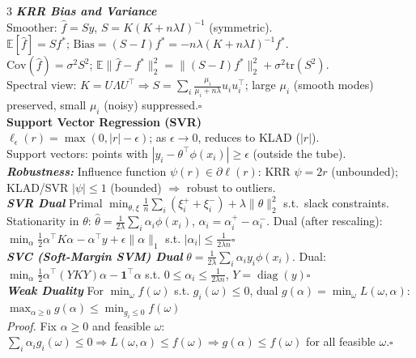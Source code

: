 \documentclass[a4paper,7pt]{article}
\begin{document}
\begin{multicols*}{3}
\textit{\textbf{KRR Bias and Variance}}\\
Smoother: $\hat f=Sy$, $S=K(K+n\lambda I)^{-1}$ (symmetric).\\
$\mathbb{E}[\hat f]=Sf^*$; $\mathrm{Bias}=(S-I)f^*=-n\lambda(K+n\lambda I)^{-1}f^*$.\\
$\mathrm{Cov}(\hat f)=\sigma^2 S^2$; $\mathbb{E}\|\hat f-f^*\|_2^2=\|(S-I)f^*\|_2^2+\sigma^2\mathrm{tr}(S^2)$.\\
Spectral view: $K=U\Lambda U^\top\Rightarrow S=\sum_i\frac{\mu_i}{\mu_i+n\lambda}u_i u_i^\top$; large $\mu_i$ (smooth modes) preserved, small $\mu_i$ (noisy) suppressed.\hfill$\square$\\

\textbf{Support Vector Regression (SVR)}\\
$\ell_\epsilon(r)=\max(0,|r|-\epsilon)$; as $\epsilon\to 0$, reduces to KLAD ($|r|$).\\
Support vectors: points with $|y_i-\theta^\top\phi(x_i)|\geq\epsilon$ (outside the tube).\\
\textit{\textbf{Robustness:}} Influence function $\psi(r)\in\partial\ell(r)$: KRR $\psi=2r$ (unbounded); KLAD/SVR $|\psi|\leq 1$ (bounded) $\Rightarrow$ robust to outliers.\\

\textit{\textbf{SVR Dual}} Primal $\min_{\theta,\xi}\frac{1}{n}\sum_i(\xi_i^++\xi_i^-)+\lambda\|\theta\|_2^2$ s.t.\ slack constraints. Stationarity in $\theta$: $\hat\theta=\frac{1}{2\lambda}\sum_i\alpha_i\phi(x_i)$, $\alpha_i=\alpha_i^+-\alpha_i^-$. Dual (after rescaling):\\
$\min_\alpha\frac{1}{2}\alpha^\top K\alpha-\alpha^\top y+\epsilon\|\alpha\|_1$ s.t. $|\alpha_i|\leq\frac{1}{2\lambda n}$\hfill$\square$\\

\textit{\textbf{SVC (Soft-Margin SVM) Dual}} $\theta=\frac{1}{2\lambda}\sum_i\alpha_i y_i\phi(x_i)$. Dual:\\
$\min_\alpha\frac{1}{2}\alpha^\top(YKY)\alpha-\mathbf{1}^\top\alpha$ s.t. $0\leq\alpha_i\leq\frac{1}{2\lambda n}$, $Y=\operatorname{diag}(y)$\hfill$\square$\\

\textit{\textbf{Weak Duality}} For $\min_\omega f(\omega)$ s.t. $g_i(\omega)\leq 0$, dual $g(\alpha)=\min_\omega L(\omega,\alpha)$:\\
$\max_{\alpha\geq 0}g(\alpha)\leq\min_{g_i\leq 0}f(\omega)$\\
\textit{Proof.} Fix $\alpha\geq 0$ and feasible $\omega$: $\sum_i\alpha_i g_i(\omega)\leq 0\Rightarrow L(\omega,\alpha)\leq f(\omega)\Rightarrow g(\alpha)\leq f(\omega)$ for all feasible $\omega$.\hfill$\square$\\


\end{multicols*}
\end{document}
